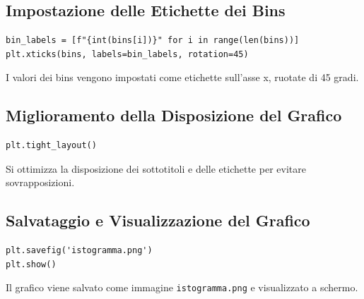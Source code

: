\documentclass[a4paper,12pt]{article}
\begin{document}
\subsection{Impostazione delle Etichette dei Bins}
\begin{lstlisting}
bin_labels = [f"{int(bins[i])}" for i in range(len(bins))]
plt.xticks(bins, labels=bin_labels, rotation=45)
\end{lstlisting}
I valori dei bins vengono impostati come etichette sull'asse x, ruotate di 45 gradi.

\subsection{Miglioramento della Disposizione del Grafico}
\begin{lstlisting}
plt.tight_layout()
\end{lstlisting}
Si ottimizza la disposizione dei sottotitoli e delle etichette per evitare sovrapposizioni.

\subsection{Salvataggio e Visualizzazione del Grafico}
\begin{lstlisting}
plt.savefig('istogramma.png')
plt.show()
\end{lstlisting}
Il grafico viene salvato come immagine \texttt{istogramma.png} e visualizzato a schermo.
\end{document}
